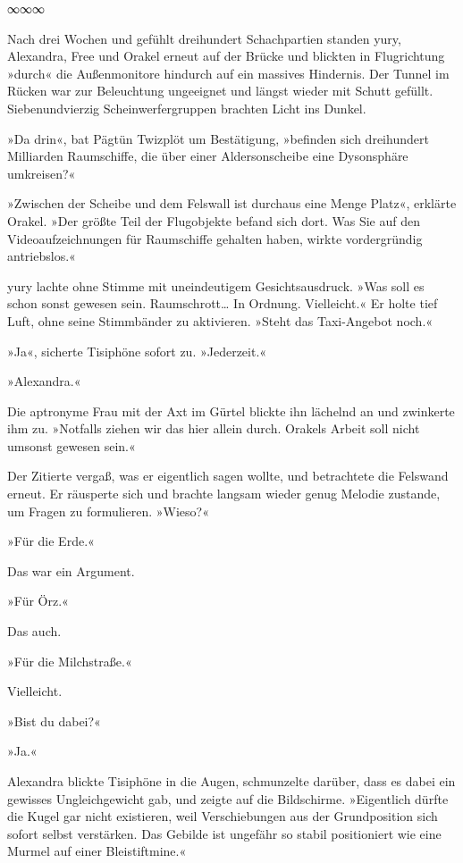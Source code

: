 \begin{center}
∞∞∞
\end{center}

Nach drei Wochen und gefühlt dreihundert Schachpartien standen yury, Alexandra, Free und Orakel erneut auf der Brücke und blickten in Flugrichtung »durch« die Außenmonitore hindurch auf ein massives Hindernis. Der Tunnel im Rücken war zur Beleuchtung ungeeignet und längst wieder mit Schutt gefüllt. Siebenundvierzig Scheinwerfergruppen brachten Licht ins Dunkel.

»Da drin«, bat Pägtün Twizplöt um Bestätigung, »befinden sich dreihundert Milliarden Raumschiffe, die über einer Aldersonscheibe eine Dysonsphäre umkreisen?«

»Zwischen der Scheibe und dem Felswall ist durchaus eine Menge Platz«, erklärte Orakel. »Der größte Teil der Flugobjekte befand sich dort. Was Sie auf den Videoaufzeichnungen für Raumschiffe gehalten haben, wirkte vordergründig antriebslos.«

yury lachte ohne Stimme mit uneindeutigem Gesichtsausdruck. »Was soll es schon sonst gewesen sein. Raumschrott… In Ordnung. Vielleicht.« Er holte tief Luft, ohne seine Stimmbänder zu aktivieren. »Steht das Taxi-Angebot noch.«

»Ja«, sicherte Tisiphöne sofort zu. »Jederzeit.«

»Alexandra.«

Die aptronyme Frau mit der Axt im Gürtel blickte ihn lächelnd an und zwinkerte ihm zu. »Notfalls ziehen wir das hier allein durch. Orakels Arbeit soll nicht umsonst gewesen sein.«

Der Zitierte vergaß, was er eigentlich sagen wollte, und betrachtete die Felswand erneut. Er räusperte sich und brachte langsam wieder genug Melodie zustande, um Fragen zu formulieren. »Wieso?«

»Für die Erde.«

Das war ein Argument.

»Für Örz.«

Das auch.

»Für die Milchstraße.«

Vielleicht.

»Bist du dabei?«

»Ja.«

Alexandra blickte Tisiphöne in die Augen, schmunzelte darüber, dass es dabei ein gewisses Ungleichgewicht gab, und zeigte auf die Bildschirme. »Eigentlich dürfte die Kugel gar nicht existieren, weil Verschiebungen aus der Grundposition sich sofort selbst verstärken. Das Gebilde ist ungefähr so stabil positioniert wie eine Murmel auf einer Bleistiftmine.«

